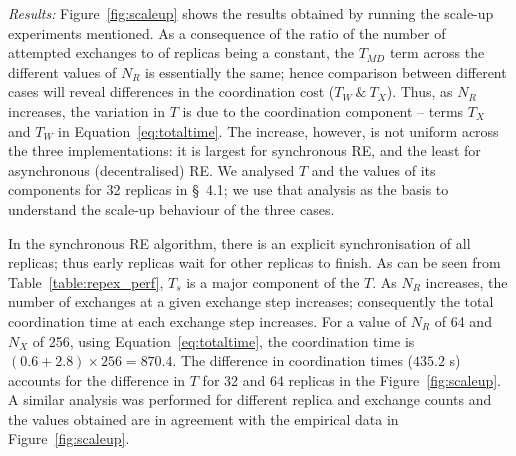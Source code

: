 \documentclass{rspublic}
\newcommand{\jhanote}[1]{ {\textcolor{red} { ***shantenu: #1 }}}
\newcommand{\athotanote}[1]{ {\textcolor{green} { ***athota: #1 }}}
\newcommand{\athotanote}[1]{}
\newcommand{\jhanote}[1]{}
\begin{document}

{\it Results:} Figure~\ref{fig:scaleup} shows the results obtained by
running the scale-up experiments mentioned.  %
As a consequence of the ratio of the number of attempted exchanges to
of replicas being a constant, the $T_{MD}$ term across the different
values of $N_R$ is essentially the same; hence comparison between
different cases will reveal differences in the coordination cost ($T_W
~\&~T_X$).  Thus, as $N_R$ increases, the variation in $T$ is due to
the coordination component -- terms $T_X$ and $T_W$ in
Equation~\ref{eq:totaltime}.  The increase, however, is not uniform
across the three implementations: it is largest for
synchronous RE, and the least for asynchronous (decentralised) RE.  We
analysed $T$ and the values of its components for 32 replicas in
\S~4.1; we use that analysis as the basis to understand the scale-up
behaviour of the three cases.
 
In the synchronous RE algorithm, there is an explicit synchronisation
of all replicas; thus early replicas wait for other replicas to
finish. As can be seen from Table~\ref{table:repex_perf}, $T_s$ is a
major component of the $T$.  As $N_R$ increases, the number of
exchanges at a given exchange step increases; consequently the total
coordination time at each exchange step increases.  For a value of
$N_R$ of 64 and $N_X$ of 256, using Equation~\ref{eq:totaltime}, the
coordination time is $(0.6+2.8) \times 256 = 870.4$.  The difference
in coordination times ($435.2$ s) accounts for the difference
in $T$ for 32 and 64 replicas in the
Figure~\ref{fig:scaleup}. %
A similar analysis was performed for different replica and exchange
counts and the values obtained are in agreement with the empirical
data in Figure~\ref{fig:scaleup}.

\end{document}
